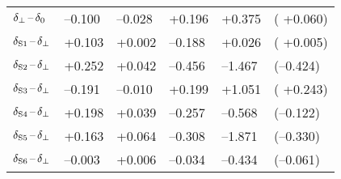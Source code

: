 \begin{table}[htbp]
\begin{tabular}{llllll}
    $\delperpzero$  &  --0.100  &  --0.028    &   +0.196  &   +0.375  &  ( +0.060)                      \\
    $\delSperp[1]$  &   +0.103  &   +0.002    &  --0.188  &   +0.026  &  ( +0.005)                      \\
    $\delSperp[2]$  &   +0.252  &   +0.042    &  --0.456  &  --1.467  &  (--0.424)                      \\
    $\delSperp[3]$  &  --0.191  &  --0.010    &   +0.199  &   +1.051  &  ( +0.243)                      \\
    $\delSperp[4]$  &   +0.198  &   +0.039    &  --0.257  &  --0.568  &  (--0.122)                      \\
    $\delSperp[5]$  &   +0.163  &   +0.064    &  --0.308  &  --1.871  &  (--0.330)                      \\
    $\delSperp[6]$  &  --0.003  &   +0.006    &  --0.034  &  --0.434  &  (--0.061)                      \\
    \hline
  \end{tabular}
\end{table}

